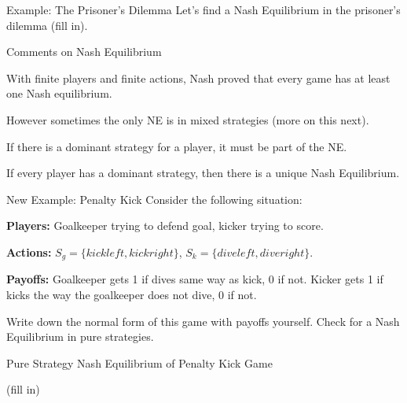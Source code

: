 \documentclass[aspectratio=169]{beamer}
\newenvironment{wideitemize}{\itemize\addtolength{\itemsep}{10pt}}{\enditemize}
\begin{document}
\begin{frame}{Example: The Prisoner's Dilemma}
Let's find a Nash Equilibrium in the prisoner's dilemma (fill in).


\vspace{6cm}

\end{frame}

\begin{frame}{Comments on Nash Equilibrium}
\begin{wideitemize}
    \item With finite players and finite actions, Nash proved that every game has at least one Nash equilibrium.
    \item However sometimes the only NE is in mixed strategies (more on this next).
    \item If there is a dominant strategy for a player, it must be part of the NE.
    \item If every player has a dominant strategy, then there is a unique Nash Equilibrium.

\end{wideitemize}


\end{frame}

\begin{frame}{New Example: Penalty Kick}
Consider the following situation:
\begin{wideitemize}
    \item \textbf{Players:} Goalkeeper trying to defend goal, kicker trying to score.
    \item \textbf{Actions:} $S_g=\{kick left, kick right\}$, $S_k=\{dive left, dive right\}$.
    \item \textbf{Payoffs:} Goalkeeper gets 1 if dives same way as kick, 0 if not. Kicker gets 1 if kicks the way the goalkeeper does not dive, 0 if not.
    
\end{wideitemize}

Write down the normal form of this game with payoffs yourself. Check for a Nash Equilibrium in pure strategies.

\end{frame}

\begin{frame}{Pure Strategy Nash Equilibrium of Penalty Kick Game}

(fill in) 

\vspace{6cm}


\end{frame}
\end{document}
